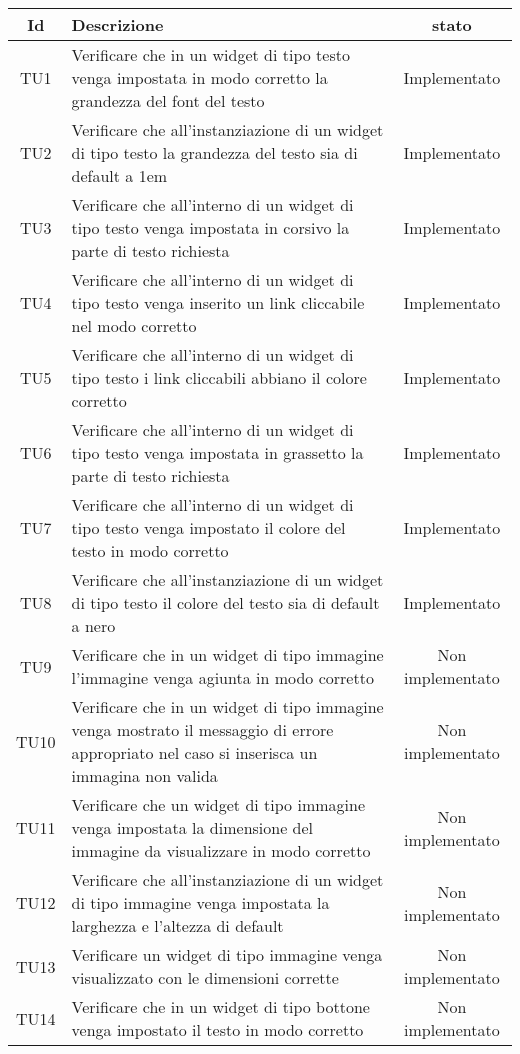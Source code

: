 \begin{center}
	\begin{longtable}{|c|>{\centering}m{10cm}|c|}\hline
		Id & Descrizione & stato \\ \hline
		TU1 & Verificare che in un widget di tipo testo venga impostata in modo corretto la grandezza del font del testo & Implementato \\ \hline
		TU2 & Verificare che all'instanziazione di un widget di tipo testo la grandezza del testo sia di default a 1em & Implementato \\ \hline
		TU3 & Verificare che all'interno di un widget di tipo testo venga impostata in corsivo la parte di testo richiesta & Implementato \\ \hline
		TU4 & Verificare che all'interno di un widget di tipo testo venga inserito un link cliccabile nel modo corretto & Implementato \\ \hline
		TU5 & Verificare che all'interno di un widget di tipo testo i link cliccabili abbiano il colore corretto & Implementato \\ \hline
		TU6 & Verificare che all'interno di un widget di tipo testo venga impostata in grassetto la parte di testo richiesta & Implementato \\ \hline
		TU7 & Verificare che all'interno di un widget di tipo testo venga impostato il colore del testo in modo corretto & Implementato \\ \hline
		TU8 & Verificare che all'instanziazione di un widget di tipo testo il colore del testo sia di default a nero & Implementato \\ \hline
		TU9 & Verificare che in un widget di tipo immagine l'immagine venga agiunta in modo corretto & Non implementato \\ \hline
		TU10 & Verificare che in un widget di tipo immagine venga mostrato il messaggio di errore appropriato nel caso si inserisca un immagina non valida & Non implementato \\ \hline
		TU11 & Verificare che un widget di tipo immagine venga impostata la dimensione del immagine da visualizzare in modo corretto & Non implementato \\ \hline
		TU12 & Verificare che all'instanziazione di un widget di tipo immagine venga impostata la larghezza e l'altezza di default & Non implementato \\ \hline
		TU13 & Verificare un widget di tipo immagine venga visualizzato con le dimensioni corrette & Non implementato \\ \hline
		TU14 & Verificare che in un widget di tipo bottone venga impostato il testo in modo corretto & Non implementato \\ \hline

\end{longtable}
\end{center}
